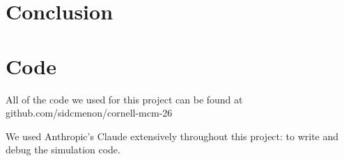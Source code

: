 \documentclass[14pt]{article}
\theoremstyle{definition}
\begin{document}
\section{Conclusion}

\printbibliography[heading=bibintoc]

\appendix
\section{Code}
All of the code we used for this project can be found at github.com/sidcmenon/cornell-mcm-26

We used Anthropic's Claude extensively throughout this project: to write and debug the
simulation code.
\end{document}
